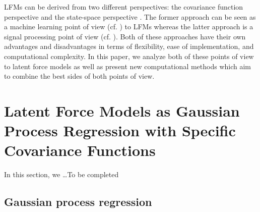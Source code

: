 \documentclass[journal]{IEEEtran}
\newcommand{\simo}[1]{{\color{red}#1}}
\begin{document}

LFMs can be derived from two different perspectives: the covariance function perspective \cite{Alvarez+Lawrence:2009,Alvarez+Luengo+Lawrence:2013} and the state-space perspective \cite{Hartikainen+Sarkka:2011,Hartikainen+Seppanen+Sarkka:2012}. The former approach can be seen as a machine learning point of view (cf. \cite{Rasmussen+Williams:2006}) to LFMs whereas the latter approach is a signal processing point of view (cf. \cite{Sarkka+Solin+Hartikainen:2013,Sarkka:2013}). Both of these approaches have their own advantages and disadvantages in terms of flexibility, ease of implementation, and computational complexity. In this paper, we analyze both of these points of view to latent force models as well as present new computational methods which aim to combine the best sides of both points of view. 




\section{Latent Force Models as Gaussian Process Regression with Specific Covariance Functions}

In this section, we \ldots \simo{To be completed}

\subsection{Gaussian process regression}\label{sec:gp:regression}
%
\end{document}
